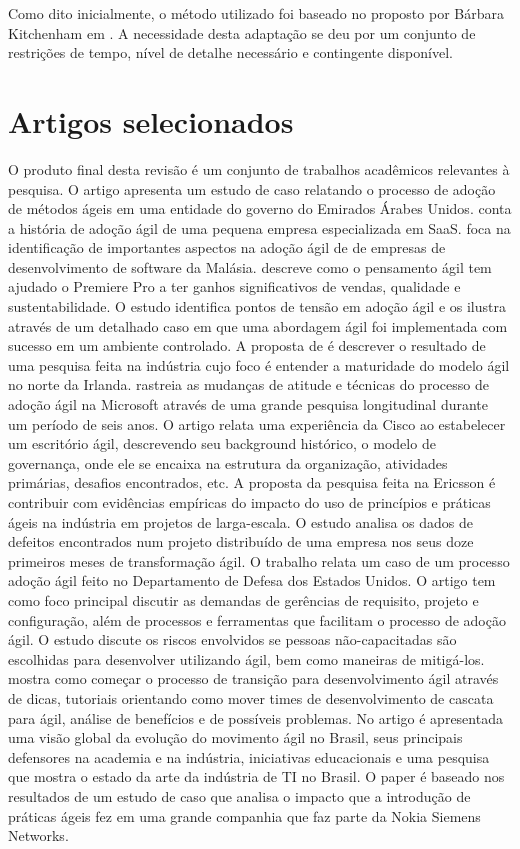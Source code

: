 			Como dito inicialmente, o método utilizado foi baseado no proposto por Bárbara Kitchenham em \cite{Barbara04}. A necessidade desta adaptação se deu por um conjunto de restrições de tempo, nível de detalhe necessário e contingente disponível.
		
	\section{Artigos selecionados}
		O produto final desta revisão é um conjunto de trabalhos acadêmicos relevantes à pesquisa. O artigo \cite{Hajjdiab2011} apresenta um estudo de caso relatando o processo de adoção de métodos ágeis em uma entidade do governo do Emirados Árabes Unidos. \cite{Block2011} conta a história de adoção ágil de uma pequena empresa especializada em SaaS. \cite{Asnawi2012} foca na identificação de importantes aspectos na adoção ágil de de empresas de desenvolvimento de software da Malásia. \cite{Adobe2012} descreve como o pensamento ágil tem ajudado o Premiere Pro a ter ganhos significativos de vendas, qualidade e sustentabilidade. O estudo \cite{Fitzgerald2013} identifica pontos de tensão em adoção ágil e os ilustra através de um detalhado caso em que uma abordagem ágil foi implementada com sucesso em um ambiente controlado. A proposta de \cite{Bustard2013} é descrever o resultado de uma pesquisa feita na indústria cujo foco é entender a maturidade do modelo ágil no norte da Irlanda. \cite{Microsoft2013} rastreia as mudanças de atitude e técnicas do processo de adoção ágil na Microsoft através de uma grande pesquisa longitudinal durante um período de seis anos. O artigo \cite{Cisco2011} relata uma experiência da Cisco ao estabelecer um escritório ágil, descrevendo seu background histórico, o modelo de governança, onde ele se encaixa na estrutura da organização, atividades primárias, desafios encontrados, etc. A proposta da pesquisa \cite{Ericsson2013} feita na Ericsson é contribuir com evidências empíricas do impacto do uso de princípios e práticas ágeis na indústria em projetos de larga-escala. O estudo \cite{Korhonen2010} analisa os dados de defeitos encontrados num projeto distribuído de uma empresa nos seus doze primeiros meses de transformação ágil. O trabalho \cite{Lapham2012} relata um caso de um processo adoção ágil feito no Departamento de Defesa dos Estados Unidos. O artigo \cite{Arikpo2011} tem como foco principal discutir as demandas de gerências de requisito, projeto e configuração, além de processos e ferramentas que facilitam o processo de adoção ágil. O estudo \cite{Radha2012} discute os riscos envolvidos se pessoas não-capacitadas são escolhidas para desenvolver utilizando ágil, bem como maneiras de mitigá-los. \cite{Eunha2012} mostra como começar o processo de transição para desenvolvimento ágil através de dicas, tutoriais orientando como mover times de desenvolvimento de cascata para ágil, análise de benefícios e de possíveis problemas. No artigo \cite{Claudia2013} é apresentada uma visão global da evolução do movimento ágil no Brasil, seus principais defensores na academia e na indústria, iniciativas educacionais e uma pesquisa que mostra o estado da arte da indústria de TI no Brasil. O paper \cite{Nokia2013} é baseado nos resultados de um estudo de caso que analisa o impacto que a introdução de práticas ágeis fez em uma grande companhia que faz parte da Nokia Siemens Networks. 
